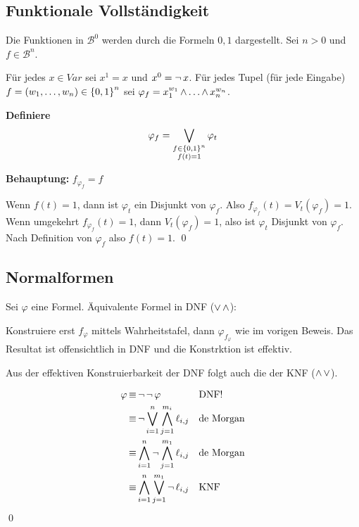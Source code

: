 \subsection{Funktionale Vollständigkeit}

Die Funktionen in $\mathcal{B}^0$ werden durch die Formeln $0,1$ dargestellt.
Sei $n>0$ und $f\in\mathcal{B}^n$.

Für jedes $x\in Var$ sei $x^1=x$ und $x^0=\operatorname{\neg} x$. Für jedes Tupel (für jede Eingabe)
$f=(w_1,\dots,w_n)\in\left\{0,1\right\}^n$ sei $\varphi_f=x_1^{w_1}\operatorname{\wedge}\dots\operatorname{\wedge} x_n^{w_n}$.

\textbf{Definiere}
\begin{align}
  \varphi_f = \operatorname*{\bigvee}_{\substack{f\in\left\{0,1\right\}^n\\ f(t) = 1}} \varphi_t
\end{align}

\textbf{Behauptung:} $f_{\varphi_f} = f$

Wenn $f(t) = 1$, dann ist $\varphi_t$ ein Disjunkt von $\varphi_f$. Also
$f_{\varphi_f}(t) = V_t(\varphi_f)=1$. Wenn umgekehrt $f_{\varphi_f}(t) = 1$,
dann $V_t(\varphi_f)=1$, also ist $\varphi_t$ Disjunkt von $\varphi_f$. Nach
Definition von $\varphi_f$ also $f(t)=1$. \qed


\subsection{Normalformen}

Sei $\varphi$ eine Formel. Äquivalente Formel in DNF ($\operatorname{\vee}\operatorname{\wedge}$):

Konstruiere erst $f_\varphi$ mittels Wahrheitstafel, dann $\varphi_{f_\varphi}$
wie im vorigen Beweis. Das Resultat ist offensichtlich in DNF und die
Konstrktion ist effektiv.

Aus der effektiven Konstruierbarkeit der DNF folgt auch die der KNF ($\operatorname{\wedge}\operatorname{\vee}$).

\begin{align}
  \varphi &\operatorname{\equiv} \operatorname{\neg}\operatorname{\neg} \varphi                                 &&\text{DNF!}\\
          &\operatorname{\equiv} \operatorname{\neg}\operatorname*{\bigvee}_{i=1}^n \operatorname*{\bigwedge}_{j=1}^{m_i} \ell_{i,j}  &&\text{de Morgan}\\
          &\operatorname{\equiv} \operatorname*{\bigwedge}_{i=1}^n \operatorname{\neg}\operatorname*{\bigwedge}_{j=1}^{m_1} \ell_{i,j} &&\text{de Morgan}\\
          &\operatorname{\equiv} \operatorname*{\bigwedge}_{i=1}^n \operatorname*{\bigvee}_{j=1}^{m_1} \operatorname{\neg}\ell_{i,j}  &&\text{KNF}
\end{align}
\qed

